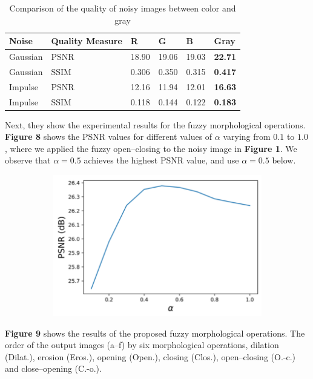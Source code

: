 \begin{table}[H]
\centering
\caption{Comparison of the quality of noisy images between color and gray}
\label{tab:comp-tab}
\begin{tabular}{|llllll|}
\hline
Noise    & Quality Measure & R     & G     & B     & Gray           \\ \hline
Gaussian & PSNR            & 18.90 & 19.06 & 19.03 & \textbf{22.71} \\
Gaussian & SSIM            & 0.306 & 0.350 & 0.315 & \textbf{0.417} \\
Impulse  & PSNR            & 12.16 & 11.94 & 12.01 & \textbf{16.63} \\
Impulse  & SSIM            & 0.118 & 0.144 & 0.122 & \textbf{0.183} \\ \hline
\end{tabular}
\end{table}

Next, they show the experimental results for the fuzzy morphological operations. \textbf{Figure 8} shows the PSNR values for different values of $\alpha$ varying from $0.1$ to $1.0$, where we applied the fuzzy open–closing to the noisy image in \textbf{Figure 1}. We observe that $\alpha = 0.5$  achieves the highest PSNR value, and use $\alpha = 0.5$ below.

\begin{figure}[H]
    \centering
    \begin{subfigure}[t]{.6\textwidth}
    \includegraphics[width=0.9\linewidth]{images/result/alpha.png}
    \centering
    \end{subfigure}
    \caption{}
\end{figure}

\textbf{Figure 9} shows the results of the proposed fuzzy morphological operations. The order of the output images (a–f) by six morphological operations, dilation (Dilat.), erosion (Eros.), opening (Open.), closing (Clos.), open–closing (O.-c.) and close–opening (C.-o.).

